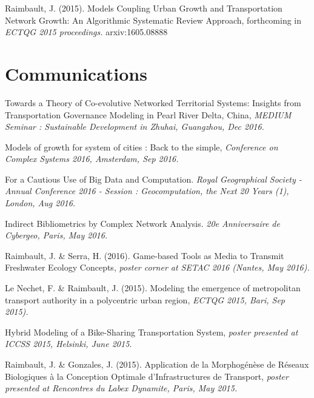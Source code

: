 \bigskip

\noindent Raimbault, J. (2015). Models Coupling Urban Growth and Transportation Network Growth: An Algorithmic Systematic Review Approach, forthcoming in \textit{ECTQG 2015 proceedings.} arxiv:1605.08888


\section*{Communications}

\noindent Towards a Theory of Co-evolutive Networked Territorial Systems: Insights from Transportation Governance Modeling in Pearl River Delta, China, \textit{MEDIUM Seminar : Sustainable Development in Zhuhai, Guangzhou, Dec 2016.}


\bigskip


\noindent Models of growth for system of cities : Back to the simple, \textit{Conference on Complex Systems 2016, Amsterdam, Sep 2016.}





\bigskip

\noindent For a Cautious Use of Big Data and Computation. \textit{Royal Geographical Society - Annual Conference 2016 - Session : Geocomputation, the Next 20 Years (1), London, Aug 2016.}


\bigskip

\noindent Indirect Bibliometrics by Complex Network Analysis. \textit{20e Anniversaire de Cybergeo, Paris, May 2016.}


\bigskip

\noindent Raimbault, J. \& Serra, H. (2016). Game-based Tools as Media to Transmit Freshwater Ecology Concepts, \textit{poster corner at SETAC 2016 (Nantes, May 2016).}


\bigskip

\noindent Le Nechet, F. \& Raimbault, J. (2015). Modeling the emergence of metropolitan transport authority in a polycentric urban region, \textit{ECTQG 2015, Bari, Sep 2015).}


\bigskip

\noindent Hybrid Modeling of a Bike-Sharing Transportation System, \textit{poster presented at ICCSS 2015, Helsinki, June 2015.}

\bigskip

\noindent Raimbault, J. \& Gonzales, J. (2015). Application de la Morphog{\'e}n{\`e}se de R{\'e}seaux Biologiques {\`a} la Conception Optimale d'Infrastructures de Transport, \textit{poster presented at Rencontres du Labex Dynamite, Paris, May 2015.}


